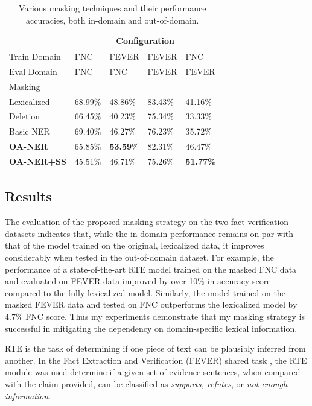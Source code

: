 \documentclass[compsoc,onecolumn]{IEEEtran}
\begin{document}
\begin{table}[ht]
\begin{center}
\begin{tabular}{p{22mm}|p{9mm}p{9mm}p{9mm}p{9mm}}
 & \multicolumn{4}{c}{Configuration} \\
 \hline
Train Domain & {FNC}& {FEVER}  & {FEVER} & {{FNC}} \\ 
Eval Domain & {FNC}& {{FNC}}  & {FEVER} & {{FEVER}} \\ \hline
Masking & & & & \\
\hline
Lexicalized &68.99\%& {48.86\%} &83.43\%& {41.16\%} \\
Deletion  &66.45\%& 40.23\% &75.34\%& 33.33\% \\
Basic NER &69.40\%& 46.27\% &76.23\%& 35.72\%\\
\textbf{OA-NER} &65.85\%& \textbf{53.59}\% &{82.31\%}& {46.47\%}\\
\textbf{OA-NER+SS} & 45.51\%& 46.71\% &75.26\%& {\bf 51.77\%}\\
\end{tabular}
\end{center}
    \caption{\label{crossdomain} Various masking techniques and their performance accuracies, both in-domain and out-of-domain.} \label{tab:results}

\end{table}


\subsection{Results} 
\label{sec:results}
The evaluation of the proposed masking strategy on the two fact verification datasets indicates that,
while the in-domain performance remains on par with that of the model trained on the original, lexicalized data, it improves considerably when tested in the out-of-domain dataset. 
For example, the performance of a state-of-the-art RTE model trained on the masked FNC data and evaluated on FEVER data improved by over 10\% in accuracy score compared to the fully lexicalized model. Similarly, the model trained on the masked FEVER data and tested on FNC outperforms the lexicalized model by 4.7\% FNC score.
Thus my experiments demonstrate that my masking strategy is successful in mitigating the dependency on domain-specific lexical information.

RTE is the task of determining if one piece of text can be plausibly inferred from another. In the Fact Extraction and Verification (FEVER) shared task \cite{thorne2018fever}, the RTE module was used determine if a given set of evidence sentences, when compared with the claim provided, can be classified as \textit{supports, refutes}, or \textit{not enough information}.
\end{document}
